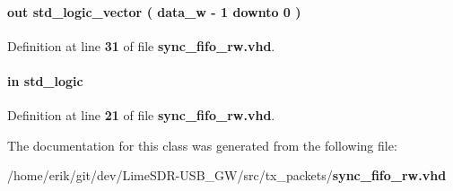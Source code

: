 \paragraph[{sync\+\_\+q}]{ {\bfseries \textcolor{keywordflow}{out}\textcolor{vhdlchar}{ }} {\bfseries \textcolor{comment}{std\+\_\+logic\+\_\+vector}\textcolor{vhdlchar}{ }\textcolor{vhdlchar}{(}\textcolor{vhdlchar}{ }\textcolor{vhdlchar}{ }\textcolor{vhdlchar}{ }\textcolor{vhdlchar}{ }{\bfseries {\bf data\+\_\+w}} \textcolor{vhdlchar}{-\/}\textcolor{vhdlchar}{ } \textcolor{vhdldigit}{1} \textcolor{vhdlchar}{ }\textcolor{keywordflow}{downto}\textcolor{vhdlchar}{ }\textcolor{vhdlchar}{ } \textcolor{vhdldigit}{0} \textcolor{vhdlchar}{ }\textcolor{vhdlchar}{)}\textcolor{vhdlchar}{ }} \hspace{0.3cm}{\ttfamily [Port]}}\label{classsync__fifo__rw_a5a44e3a82c3752e272a3d73601e9c7ad}


Definition at line {\bf 31} of file {\bf sync\+\_\+fifo\+\_\+rw.\+vhd}.

\paragraph[{wclk}]{ {\bfseries \textcolor{keywordflow}{in}\textcolor{vhdlchar}{ }} {\bfseries \textcolor{comment}{std\+\_\+logic}\textcolor{vhdlchar}{ }} \hspace{0.3cm}{\ttfamily [Port]}}\label{classsync__fifo__rw_adc5d3b386b1979488fb85997e33fbd78}


Definition at line {\bf 21} of file {\bf sync\+\_\+fifo\+\_\+rw.\+vhd}.



The documentation for this class was generated from the following file\+:\begin{DoxyCompactItemize}
\item 
/home/erik/git/dev/\+Lime\+S\+D\+R-\/\+U\+S\+B\+\_\+\+G\+W/src/tx\+\_\+packets/{\bf sync\+\_\+fifo\+\_\+rw.\+vhd}\end{DoxyCompactItemize}
